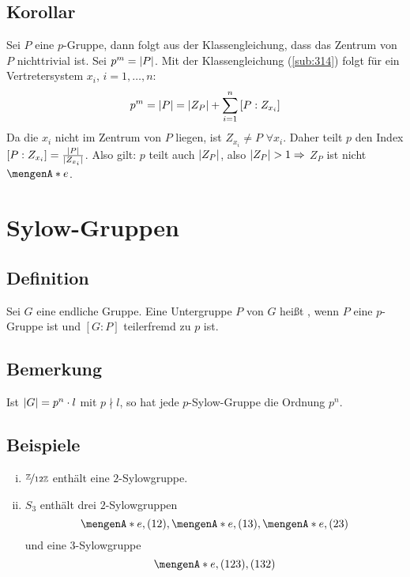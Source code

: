 \subsection[Korollar: $p$-Gruppen haben ein nichttriviales Zentrum]{Korollar} %
\label{sub:317}
Sei $P$ eine $p$-Gruppe, dann folgt aus der Klassengleichung, dass das Zentrum von $P$ nichttrivial ist.
Sei $p^m = \abs{P} $. Mit der Klassengleichung (\ref{sub:314}) folgt für ein Vertretersystem $x_i$, $i=1,\ldots ,n$:
\[
	p^m = \abs{P} = \abs{Z_P} + \sum_{i=1}^{n} \left[P : Z_{x_i}\right]  
\]
Da die $x_i$ nicht im Zentrum von $P$ liegen, ist $Z_{x_i} \not= P$ $\forall x_i$. Daher teilt $p$ den Index $[P:Z_{x_i}] = \frac{\abs{P} }{\abs{Z_{x_i}}}$. Also gilt: $p$ teilt
auch $\abs{Z_P} $, also $\abs{Z_P} >1 \Rightarrow $ $Z_P$ ist nicht $\set{e} $. \bewende
\newpage

\section{Sylow-Gruppen} %
\label{sec:4}

\subsection[Definition: $p$-Sylow-Gruppe]{Definition} %
\label{sub:41}
Sei $G$ eine endliche Gruppe. Eine Untergruppe $P$ von $G$ heißt , wenn $P$ eine $p$-Gruppe ist und $[G:P]$ teilerfremd zu $p$ ist. 

\subsection[Bemerkung über die Ordnung von $p$-Sylowgruppen]{Bemerkung} %
\label{sub:42}
Ist $\abs{G}= p^n \cdot l $ mit $p \nmid l$, so hat jede $p$-Sylow-Gruppe die Ordnung $p^n$.

\subsection[Beispiele für $p$-Sylowgruppen]{Beispiele} %
\label{sub:43}
\begin{enumerate}[(i)]
	\item $\nicefrac{\mathds{Z}}{12 \mathds{Z}}$ enthält eine $2$-Sylowgruppe.
	\item $S_3$ enthält drei $2$-Sylowgruppen
	\[
		\set{e, (1 2)}, \set{e,(1 3)}, \set{e, (2 3)}   
	\]
	und eine $3$-Sylowgruppe
	\[
		\set{e, (1 2 3), (1 3 2)} 
	\]
\end{enumerate}

